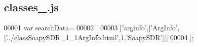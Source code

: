 \subsection{classes\+\_.\+js}
\label{classes__0_8js_source}

\begin{DoxyCode}
00001 var searchData=
00002 [
00003   [\textcolor{stringliteral}{'arginfo'},[\textcolor{stringliteral}{'ArgInfo'},[\textcolor{stringliteral}{'../classSoapySDR\_1\_1ArgInfo.html'},1,\textcolor{stringliteral}{'SoapySDR'}]]]
00004 ];
\end{DoxyCode}
